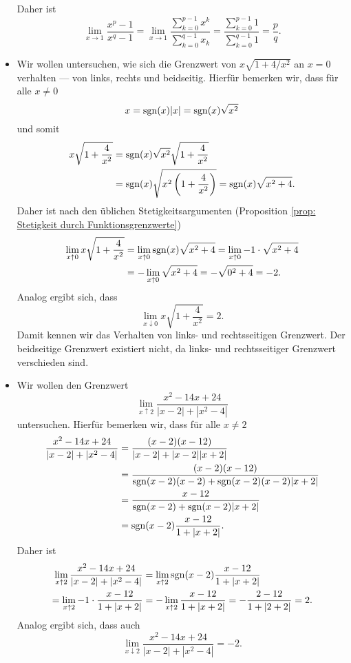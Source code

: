 \documentclass[a4paper,10pt]{article}
\begin{document}
\begin{bsp}
\begin{itemize}
\[   \]
   Daher ist
   \[
    \lim_{x \to 1} \frac{x^p-1}{x^q-1}
    = \lim_{x \to 1} \frac{\sum_{k=0}^{p-1} x^k}{\sum_{k=0}^{q-1} x_k}
    = \frac{\sum_{k=0}^{p-1} 1}{\sum_{k=0}^{q-1} 1}
    = \frac{p}{q}.
   \]
  \item
   Wir wollen untersuchen, wie sich die Grenzwert von $x \sqrt{1 + 4/x^2}$ an $x = 0$ verhalten --- von links, rechts und beidseitig. Hierfür bemerken wir, dass für alle $x \neq 0$
   \[
    x = \operatorname{sgn}(x) |x| = \operatorname{sgn}(x) \sqrt{x^2}
   \]
   und somit
   \begin{align*}
    x \sqrt{1 + \frac{4}{x^2}}
    &= \operatorname{sgn}(x) \sqrt{x^2} \sqrt{1 + \frac{4}{x^2}} \\
    &= \operatorname{sgn}(x) \sqrt{x^2 \left(1 +\frac{4}{x^2}\right)}
    = \operatorname{sgn}(x) \sqrt{x^2 + 4}.
   \end{align*}
   Daher ist nach den üblichen Stetigkeitsargumenten (Proposition \ref{prop: Stetigkeit durch Funktionsgrenzwerte})
   \begin{align*}
    \lim_{x \uparrow 0} x \sqrt{1 + \frac{4}{x^2}}
    &= \lim_{x \uparrow 0} \operatorname{sgn}(x) \sqrt{x^2 + 4}
    = \lim_{x \uparrow 0} -1 \cdot \sqrt{x^2 + 4} \\
    &= -\lim_{x \uparrow 0} \sqrt{x^2 + 4}
    = - \sqrt{0^2 + 4}
    = -2.
   \end{align*}
   Analog ergibt sich, dass
   \[
    \lim_{x \downarrow 0} x \sqrt{1 + \frac{4}{x^2}}
    = 2.
   \]
   Damit kennen wir das Verhalten von links- und rechtsseitigen Grenzwert. Der beidseitige Grenzwert existiert nicht, da links- und rechtsseitiger Grenzwert verschieden sind.
  \item
   Wir wollen den Grenzwert
   \[
    \lim_{x \uparrow 2} \frac{x^2 - 14x + 24}{|x-2| + |x^2-4|}
   \]
   untersuchen. Hierfür bemerken wir, dass für alle $x \neq 2$
   \begin{align*}
    \frac{x^2 - 14x + 24}{|x-2| + |x^2-4|}
    &= \frac{(x-2)(x-12)}{|x-2| + |x-2| |x+2|} \\
    &= \frac{(x-2)(x-12)}{\operatorname{sgn}(x-2)(x-2) + \operatorname{sgn}(x-2)(x-2)|x+2|} \\
    &= \frac{x-12}{\operatorname{sgn}(x-2) + \operatorname{sgn}(x-2)|x+2|} \\
    &= \operatorname{sgn}(x-2) \frac{x-12}{1 + |x+2|}.
   \end{align*}
   Daher ist
   \begin{align*}
    \lim_{x \uparrow 2} \frac{x^2 - 14x + 24}{|x-2| + |x^2-4|}
    &= \lim_{x \uparrow 2} \operatorname{sgn}(x-2) \frac{x-12}{1+|x+2|} \\
    = \lim_{x \uparrow 2} -1 \cdot \frac{x-12}{1+|x+2|}
    &= -\lim_{x \uparrow 2} \frac{x-12}{1+|x+2|}
    = - \frac{2-12}{1+|2+2|}
    = 2.
   \end{align*}
   Analog ergibt sich, dass auch
   \[
    \lim_{x \downarrow 2} \frac{x^2 - 14x + 24}{|x-2| + |x^2-4|} = -2.
   \]
 \end{itemize}
\end{bsp}
\end{document}
